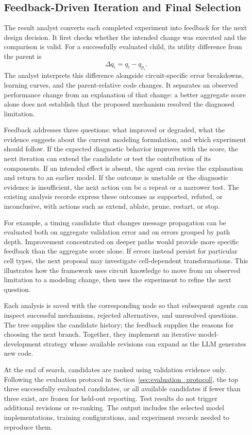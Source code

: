 \subsection{Feedback-Driven Iteration and Final Selection}
\label{sec:feedback_iteration}

The result analyst converts each completed experiment into feedback for the next design decision. It first checks whether the intended change was executed and the comparison is valid. For a successfully evaluated child, its utility difference from the parent is
\begin{equation}
    \Delta q_i=q_i-q_{p_i}.
    \label{eq:parent_improvement}
\end{equation}
The analyst interprets this difference alongside circuit-specific error breakdowns, learning curves, and the parent-relative code changes. It separates an observed performance change from an explanation of that change: a better aggregate score alone does not establish that the proposed mechanism resolved the diagnosed limitation.

Feedback addresses three questions: what improved or degraded, what the evidence suggests about the current modeling formulation, and which experiment should follow. If the expected diagnostic behavior improves with the score, the next iteration can extend the candidate or test the contribution of its components. If an intended effect is absent, the agent can revise the explanation and return to an earlier model. If the outcome is unstable or the diagnostic evidence is insufficient, the next action can be a repeat or a narrower test. The existing analysis records express these outcomes as supported, refuted, or inconclusive, with actions such as extend, ablate, prune, restart, or stop.

For example, a timing candidate that changes message propagation can be evaluated both on aggregate validation error and on errors grouped by path depth. Improvement concentrated on deeper paths would provide more specific feedback than the aggregate score alone. If errors instead persist for particular cell types, the next proposal may investigate cell-dependent transformations. This illustrates how the framework uses circuit knowledge to move from an observed limitation to a modeling change, then uses the experiment to refine the next question.

Each analysis is saved with the corresponding node so that subsequent agents can inspect successful mechanisms, rejected alternatives, and unresolved questions. The tree supplies the candidate history; the feedback supplies the reasons for choosing the next branch. Together, they implement an iterative model-development strategy whose available revisions can expand as the LLM generates new code.

At the end of search, candidates are ranked using validation evidence only. Following the evaluation protocol in Section~\ref{sec:evaluation_protocol}, the top three successfully evaluated candidates, or all available candidates if fewer than three exist, are frozen for held-out reporting. Test results do not trigger additional revisions or re-ranking. The output includes the selected model implementations, training configurations, and experiment records needed to reproduce them.
